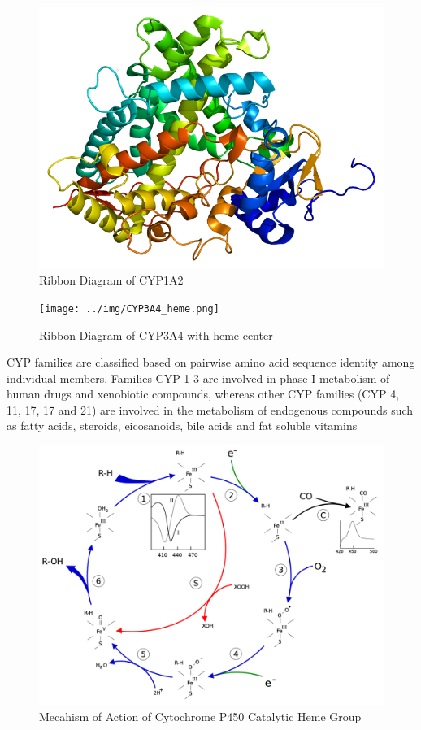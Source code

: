 \begin{figure}[h,t]
  \caption{Ribbon Diagram of CYP1A2}
  \centering
   \includegraphics[]{../img/CYP1A2_PDB.png}
\end{figure}

\begin{figure}[h,t]
  \caption{Ribbon Diagram of CYP3A4 with heme center}
  \centering
   \texttt{[image: ../img/CYP3A4\_heme.png]}
\end{figure}


CYP families are classified based on pairwise amino acid sequence identity among individual members. Families CYP 1-3 are involved in phase I metabolism of human drugs and xenobiotic compounds, whereas other CYP families (CYP 4, 11, 17, 17 and 21) are involved in the metabolism of endogenous compounds such as fatty acids, steroids, eicosanoids, bile acids and fat soluble vitamins\cite{Singh2011}

\begin{figure}[h,t]
  \caption{Mecahism of Action of Cytochrome P450 Catalytic Heme Group}
  \centering
   \includegraphics[]{../img/P450MOA.png}
\end{figure}

